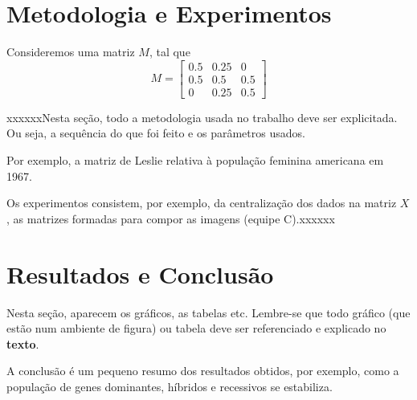 \documentclass[a4paper,12pt]{article}
\begin{document}
\section{Metodologia e Experimentos}
\label{sec:metodologia}


Consideremos uma matriz $M$, tal que
\begin{displaymath}
M = \begin{bmatrix}
0.5&0.25&0\\
0.5&0.5&0.5\\
0&0.25&0.5
\end{bmatrix}
\end{displaymath}

xxxxxxNesta seção, todo a metodologia usada no trabalho deve ser explicitada. Ou seja, a sequência do que foi feito e os parâmetros usados.

Por exemplo, a matriz de Leslie relativa à população feminina americana em 1967.

Os experimentos consistem, por exemplo, da centralização dos dados na matriz $X$, as matrizes formadas para compor as imagens (equipe C).xxxxxx



\section{Resultados e Conclusão}
\label{sec:resultados}

Nesta seção, aparecem os gráficos, as tabelas etc. Lembre-se que todo gráfico (que estão num ambiente de figura) ou tabela deve ser referenciado e explicado no \textbf{texto}.

A conclusão é um pequeno resumo dos resultados obtidos, por exemplo, como a população de genes dominantes, híbridos e recessivos se estabiliza.


% 

\end{document}
